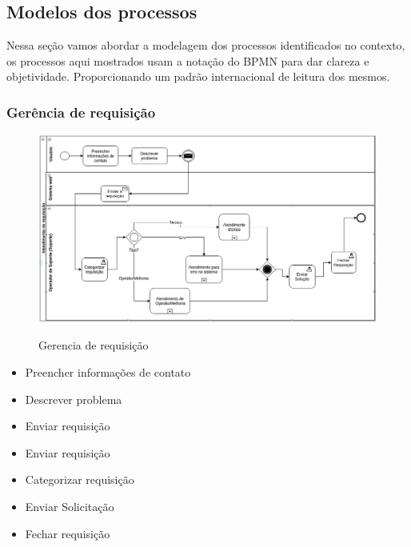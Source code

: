 \documentclass[11pt,a4paper]{article}
\begin{document}
\subsection{Modelos dos processos}
Nessa seção vamos abordar a modelagem dos processos identificados no contexto,
os processos aqui mostrados usam a notação do BPMN para dar clareza e objetividade.
Proporcionando um padrão internacional de leitura dos mesmos.


\subsubsection{Gerência de requisição}
\begin{figure}[!h]
\caption{Gerencia de requisição}
\centering %
\includegraphics[width=15cm]{as-is/01_atendimento_de_requisicao.png}
\label{figura:atendimento_requisicao_as_is}
\end{figure}

\begin{itemize}[noitemsep]
	\item Preencher informações de contato
	\item Descrever problema
	\item Enviar requisição
	\item Enviar requisição
	\item Categorizar requisição
	\item Enviar Solicitação
	\item Fechar requisição
\end{itemize}
\end{document}
